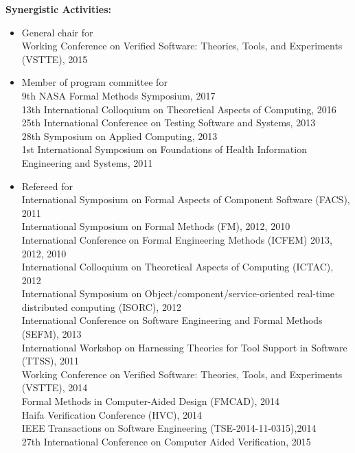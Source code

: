 \documentclass{article}
\begin{document}
\medskip
\noindent
{\bf Synergistic Activities:}
\begin{itemize}\itemsep=0em
\item General chair for \\
 Working Conference on Verified Software: Theories, Tools, and
  Experiments (VSTTE), 2015
\item Member of program committee for 
\\
9th NASA Formal Methods Symposium, 2017 
\\
13th International Colloquium on Theoretical Aspects of Computing, 2016 
\\
25th International Conference on Testing Software and Systems, 2013
\\
 28th Symposium on Applied Computing, 2013
\\
 1st International Symposium on Foundations of Health Information Engineering
and Systems, 2011

\item Refereed for
\\ %
International Symposium on Formal Aspects of Component Software (FACS), 2011  
\\ 
International Symposium on Formal Methods (FM), 2012, 2010
\\
 International Conference on Formal Engineering Methods (ICFEM) 2013, 2012, 2010
\\
 International Colloquium on Theoretical Aspects of Computing (ICTAC), 2012
\\
 International Symposium on Object/component/service-oriented real-time distributed computing (ISORC), 2012  
\\
 International Conference on Software Engineering and Formal Methods (SEFM), 2013
\\
 International Workshop on Harnessing Theories for Tool Support in Software (TTSS), 2011  
\\
 Working Conference on Verified Software: Theories, Tools, and
  Experiments (VSTTE), 2014
\\
 Formal Methods in Computer-Aided Design (FMCAD), 2014
\\
 Haifa Verification Conference (HVC), 2014
 \\
 IEEE Transactions on Software Engineering (TSE-2014-11-0315),2014 
 \\
27th International Conference on Computer Aided Verification, 2015 
\\


\end{itemize}
\end{document}
